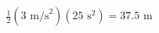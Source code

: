 \documentclass[preview]{standalone}
\begin{document}
\begin{align*}
\frac{1}{2}(3 \text{ m/s}^2)(25 \text{ s}^2) = 37.5 \text{ m}
\end{align*}
\end{document}
